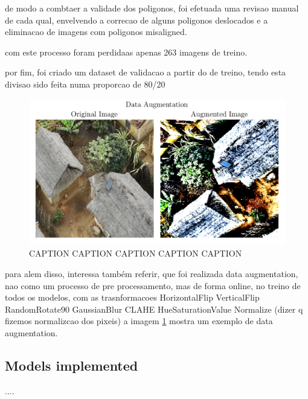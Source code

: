 \documentclass[conference]{IEEEtran}
\begin{document}
de modo a combtaer a validade dos poligonos, foi efetuada uma revisao manual de cada qual, envelvendo a correcao de alguns poligonos deslocados e a eliminacao de imagens com poligonos misaligned.


com este processo foram perdidaas apenas 263 imagens de treino.

por fim, foi criado um dataset de validacao a partir do de treino, tendo esta divisao sido feita numa proporcao de 80/20

\begin{figure}[H]
    \centering
    \includegraphics[width=1\linewidth]{assets/data_augmentation.png}
    \caption{CAPTION CAPTION CAPTION CAPTION CAPTION}
    \label{fig:data_augmentation}
\end{figure}

para alem disso, interessa também referir, que foi realizada data augmentation, nao como um processo de pre processamento, mas de forma online, no treino de todos os modelos, com as trasnformacoes
HorizontalFlip
VerticalFlip
RandomRotate90
GaussianBlur
CLAHE
HueSaturationValue
Normalize (dizer q fizemos normalizcao dos pixeis)
a imagem \ref{fig:data_augmentation} mostra um exemplo de data augmentation.





\subsection{Models implemented}

....
\end{document}
